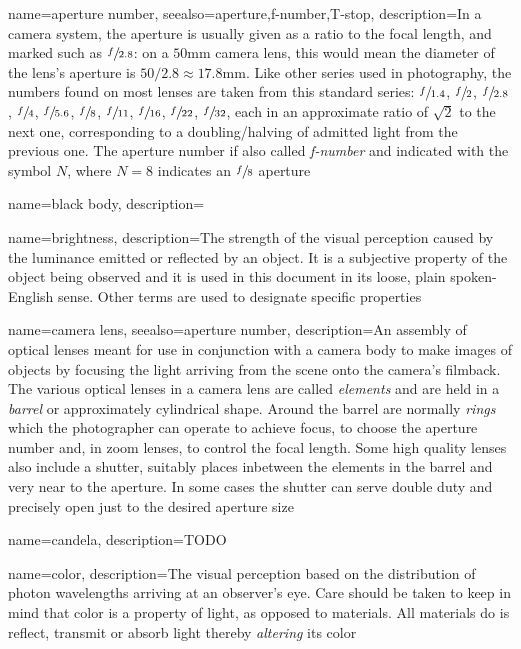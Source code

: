 {
	name={aperture number},
	seealso={aperture,f-number,T-stop},
	description={In a camera system, the aperture is usually given as a ratio to the
		focal length, and marked such as $\sfrac{f}{2.8}$: on a $50\unit{\milli\meter}$ 
		camera lens, this would mean the diameter of the lens's aperture 
		is $50 / 2.8 \approx 17.8\unit{\milli\meter}$. 
		Like other series used in photography, the
		numbers found on most lenses are taken from this standard series:
		$\sfrac{f}{1.4}$, $\sfrac{f}{2}$, $\sfrac{f}{2.8}$, $\sfrac{f}{4}$, $\sfrac{f}{5.6}$,
		$\sfrac{f}{8}$, $\sfrac{f}{11}$, $\sfrac{f}{16}$, $\sfrac{f}{22}$, $\sfrac{f}{32}$,
		each in an approximate ratio of $\sqrt{2}$ to the next one, corresponding to a doubling/halving of admitted light from the previous one.
	    The aperture number if also called \textsl{f-number} and indicated with the symbol
    	$N$, where $N=8$ indicates an $\sfrac{f}{8}$ aperture}
}

{
	name={black body},
	description=\nopostdesc
}

{
  name=brightness,
  description={The strength of the visual perception caused by the luminance emitted or
    reflected by an object. It is a subjective property of the object being
    observed and it is used in this document in its loose, 
    plain spoken-English sense. 
    Other terms are used to designate specific properties}
}

{
	name={camera lens},
	seealso={aperture number},
	description={An assembly of optical lenses meant for use in conjunction with a 
		camera body to make images of objects by focusing the light arriving from the scene
		onto the camera's filmback. 
		The various optical lenses in a camera lens are called \textsl{elements} and 
		are held in a \textsl{barrel} or approximately cylindrical shape.
		Around the barrel are normally \textsl{rings} which the photographer can
		operate to achieve focus, to choose the aperture number and, in zoom lenses, to
		control the focal length.
		Some high quality lenses also include a shutter, suitably places inbetween the
		elements in the barrel and very near to the aperture. In some cases the shutter 
		can serve double duty and precisely open just to the desired aperture size}
}

{
	name={candela},
	description={TODO}
}

{
	name={color},
	description={The visual perception based on the distribution of photon wavelengths arriving
		at an observer's eye. Care should be taken to keep in mind that color is a property of
		light, as opposed to materials. All materials do is reflect, transmit or absorb light
		thereby \emph{altering} its color}
}

